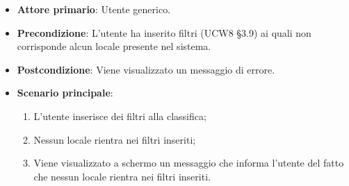 \begin{itemize}
    \item \textbf{Attore primario}: Utente generico.
    \item \textbf{Precondizione}: L'utente ha inserito filtri (UCW8 §3.9) ai quali non corrisponde alcun locale presente nel sistema.
    \item \textbf{Postcondizione}: Viene visualizzato un messaggio di errore.
    \item \textbf{Scenario principale}: 
    \begin{enumerate}
        \item L'utente inserisce dei filtri alla classifica;
        \item Nessun locale rientra nei filtri inseriti;
        \item Viene visualizzato a schermo un messaggio che informa l'utente del fatto che nessun locale rientra nei filtri inseriti.
    \end{enumerate}
\end{itemize}
